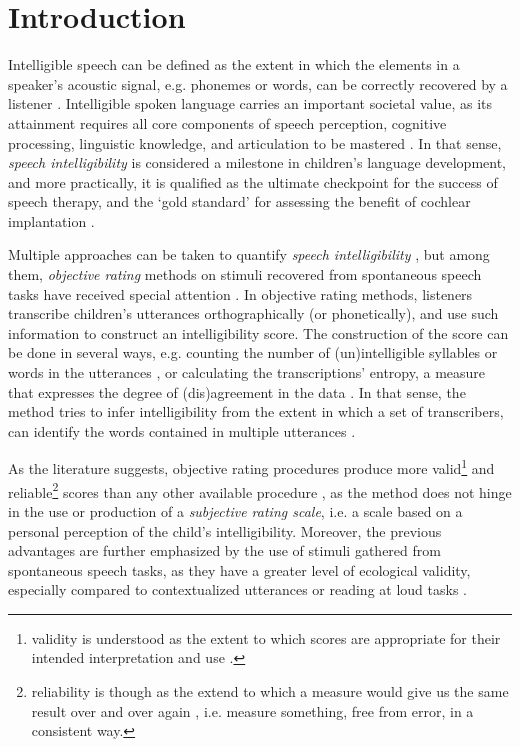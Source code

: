\section{Introduction} \label{S:introduction}

Intelligible speech can be defined as the extent in which the elements in a speaker's acoustic signal, e.g. phonemes or words, can be correctly recovered by a listener \cite{Freeman_et_al_2017, Kent_et_al_1989, vanHeuven_2008, Whitehill_et_al_2004}. Intelligible spoken language carries an important societal value, as its attainment requires all core components of speech perception, cognitive processing, linguistic knowledge, and articulation to be mastered \cite{Freeman_et_al_2017}. In that sense, \textit{speech intelligibility} is considered a milestone in children's language development, and more practically, it is qualified as the ultimate checkpoint for the success of speech therapy, and the `gold standard' for assessing the benefit of cochlear implantation \cite{Chin_et_al_2012}. 

Multiple approaches can be taken to quantify \textit{speech intelligibility} \cite{Boonen_et_al_2020, Boonen_et_al_2021, Flipsen_2006, Hustad_et_al_2020}, but among them, \textit{objective rating} methods on stimuli recovered from spontaneous speech tasks have received special attention \cite{Boonen_et_al_2021, Hustad_et_al_2020}. In objective rating methods, listeners transcribe children's utterances orthographically (or phonetically), and use such information to construct an intelligibility score. The construction of the score can be done in several ways, e.g. counting the number of (un)intelligible syllables or words in the utterances \cite{Flipsen_2006, Lagerberg_et_al_2014}, or calculating the transcriptions' entropy, a measure that expresses the degree of (dis)agreement in the data \cite{Boonen_et_al_2021, Shannon_1948}. In that sense, the method tries to infer intelligibility from the extent in which a set of transcribers, can identify the words contained in multiple utterances \cite{Boonen_et_al_2021}. 

As the literature suggests, objective rating procedures produce more valid\footnote{validity is understood as the extent to which scores are appropriate for their intended interpretation and use \cite{Lesterhuis_2018, Trochim_2022}.} and reliable\footnote{reliability is though as the extend to which a measure would give us the same result over and over again \cite{Trochim_2022}, i.e. measure something, free from error, in a consistent way.} scores than any other available procedure \cite{Boonen_et_al_2021, Faes_et_al_2021}, as the method does not hinge in the use or production of a \textit{subjective rating scale}, i.e. a scale based on a personal perception of the child's intelligibility. Moreover, the previous advantages are further emphasized by the use of stimuli gathered from spontaneous speech tasks, as they have a greater level of ecological validity, especially compared to contextualized utterances or reading at loud tasks \cite{Flipsen_2006, Ertmer_2011}.

